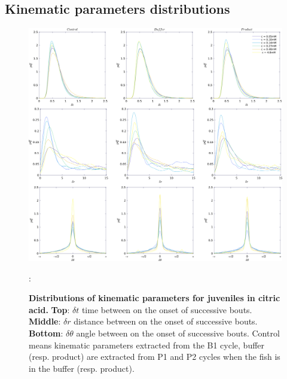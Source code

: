 \begin{appendices}
  \chapter{Kinematic parameters distributions}
    \begin{figure}[h!]
      \centering
      \includegraphics[width=1\textwidth]{part_2/assets/dist_citric_random.png}
      \caption{\textbf{Distributions of kinematic parameters for juveniles in citric acid.} \textbf{Top}: $\delta t$ time between on the onset of successive bouts. \textbf{Middle}: $\delta r$ distance between on the onset of successive bouts. \textbf{Bottom}: $\delta \theta$ angle between on the onset of successive bouts. Control means kinematic parameters extracted from the B1 cycle, buffer (resp. product) are extracted from P1 and P2 cycles when the fish is in the buffer (resp. product).}
      \label{dist_time_bout}:
    \end{figure}


\end{appendices}
